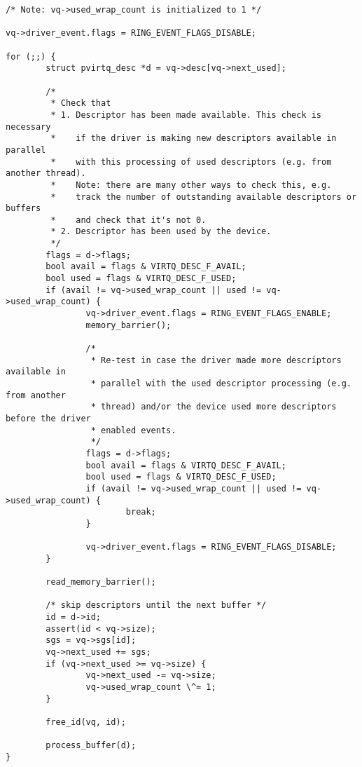 \begin{lstlisting}
/* Note: vq->used_wrap_count is initialized to 1 */

vq->driver_event.flags = RING_EVENT_FLAGS_DISABLE;

for (;;) {
        struct pvirtq_desc *d = vq->desc[vq->next_used];

        /*
         * Check that
         * 1. Descriptor has been made available. This check is necessary
         *    if the driver is making new descriptors available in parallel
         *    with this processing of used descriptors (e.g. from another thread).
         *    Note: there are many other ways to check this, e.g.
         *    track the number of outstanding available descriptors or buffers
         *    and check that it's not 0.
         * 2. Descriptor has been used by the device.
         */
        flags = d->flags;
        bool avail = flags & VIRTQ_DESC_F_AVAIL;
        bool used = flags & VIRTQ_DESC_F_USED;
        if (avail != vq->used_wrap_count || used != vq->used_wrap_count) {
                vq->driver_event.flags = RING_EVENT_FLAGS_ENABLE;
                memory_barrier();

                /*
                 * Re-test in case the driver made more descriptors available in
                 * parallel with the used descriptor processing (e.g. from another
                 * thread) and/or the device used more descriptors before the driver
                 * enabled events.
                 */
                flags = d->flags;
                bool avail = flags & VIRTQ_DESC_F_AVAIL;
                bool used = flags & VIRTQ_DESC_F_USED;
                if (avail != vq->used_wrap_count || used != vq->used_wrap_count) {
                        break;
                }

                vq->driver_event.flags = RING_EVENT_FLAGS_DISABLE;
        }

        read_memory_barrier();

        /* skip descriptors until the next buffer */
        id = d->id;
        assert(id < vq->size);
        sgs = vq->sgs[id];
        vq->next_used += sgs;
        if (vq->next_used >= vq->size) {
                vq->next_used -= vq->size;
                vq->used_wrap_count \^= 1;
        }

        free_id(vq, id);

        process_buffer(d);
}
\end{lstlisting}
